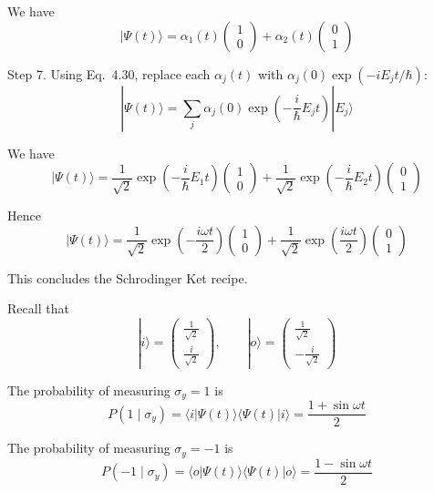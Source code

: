 \documentclass[12pt]{article}
\begin{document}
We have
\begin{equation*}
|\Psi(t)\rangle
=\alpha_1(t)\begin{pmatrix}1\\0\end{pmatrix}
+\alpha_2(t)\begin{pmatrix}0\\1\end{pmatrix}
\end{equation*}

Step 7.
Using Eq.~4.30, replace each $\alpha_j(t)$ with
$\alpha_j(0)\exp(-iE_jt/\hbar)$:
\begin{equation*}
|\Psi(t)\rangle=\sum_j\alpha_j(0)
\exp\left(-\frac{i}{\hbar}E_jt\right)
|E_j\rangle
\tag{4.34}
\end{equation*}

We have
\begin{equation*}
|\Psi(t)\rangle
=\frac{1}{\sqrt2}\exp\left(-\frac{i}{\hbar}E_1t\right)\begin{pmatrix}1\\0\end{pmatrix}
+\frac{1}{\sqrt2}\exp\left(-\frac{i}{\hbar}E_2t\right)\begin{pmatrix}0\\1\end{pmatrix}
\end{equation*}

Hence
\begin{equation*}
|\Psi(t)\rangle
=\frac{1}{\sqrt2}\exp\left(-\frac{i\omega t}{2}\right)\begin{pmatrix}1\\0\end{pmatrix}
+\frac{1}{\sqrt2}\exp\left(\frac{i\omega t}{2}\right)\begin{pmatrix}0\\1\end{pmatrix}
\end{equation*}

This concludes the Schrodinger Ket recipe.

\bigskip
Recall that
\begin{equation*}
|i\rangle=\begin{pmatrix}\frac{1}{\sqrt2}\\[1ex]\frac{i}{\sqrt2}\end{pmatrix},
\qquad
|o\rangle=\begin{pmatrix}\frac{1}{\sqrt2}\\[1ex]-\frac{i}{\sqrt2}\end{pmatrix}
\end{equation*}

The probability of measuring $\sigma_y=1$ is
\begin{equation*}
P(1\mid\sigma_y)=\langle i|\Psi(t)\rangle\langle\Psi(t)|i\rangle
=\frac{1+\sin\omega t}{2}
\end{equation*}

The probability of measuring $\sigma_y=-1$ is
\begin{equation*}
P(-1\mid\sigma_y)=\langle o|\Psi(t)\rangle\langle\Psi(t)|o\rangle
=\frac{1-\sin\omega t}{2}
\end{equation*}
\end{document}
